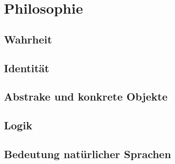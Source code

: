 \chapter{Philosophie}

\section{Wahrheit}

\section{Identität}


\section{Abstrake und konkrete Objekte}

\section{Logik}

\section{Bedeutung natürlicher Sprachen}

